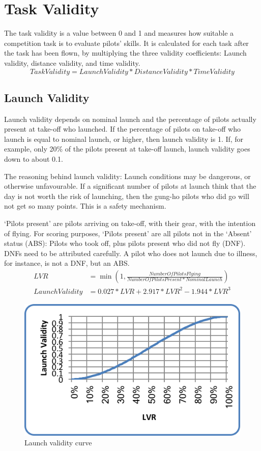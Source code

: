 \documentclass{article}
\begin{document}
\newpage
\section{Task Validity}
The task validity is a value between 0 and 1 and measures how suitable
a competition task is to evaluate pilots’ skills. It is calculated for each
task after the task has been flown, by multiplying the three validity
coefficients: Launch validity, distance validity, and time validity.
\begin{equation*}
    TaskValidity = LaunchValidity * DistanceValidity * TimeValidity
\end{equation*}

\subsection{Launch Validity}
\label{sec:launch-validity}
Launch validity depends on nominal launch and the percentage of pilots actually
present at take-off who launched. If the percentage of pilots on take-off who
launch is equal to nominal launch, or higher, then launch validity is 1. If,
for example, only 20\% of the pilots present at take-off launch, launch
validity goes down to about 0.1.

The reasoning behind launch validity: Launch conditions may be dangerous, or
otherwise unfavourable.  If a significant number of pilots at launch think that
the day is not worth the risk of launching, then the gung-ho pilots who did go
will not get so many points. This is a safety mechanism.

‘Pilots present’ are pilots arriving on take-off, with their gear, with the
intention of flying. For scoring purposes, ‘Pilots present’ are all pilots not
in the ‘Absent’ status (ABS): Pilots who took off, plus pilots present who did
not fly (DNF). DNFs need to be attributed carefully. A pilot who does not
launch due to illness, for instance, is not a DNF, but an ABS.
\begin{align*}
    LVR &= \min(1, \frac{NumberOfPilotsFlying}{NumberOfPilotsPresent * NominalLaunch}) \\
    LaunchValidity &= 0.027 * LVR + 2.917 * LVR^2 - 1.944 * LVR^3
\end{align*}

\begin{figure}[h!]
    \centering
    \includegraphics{img/launch-validity.png}
    \caption{Launch validity curve}
\end{figure}
\end{document}
